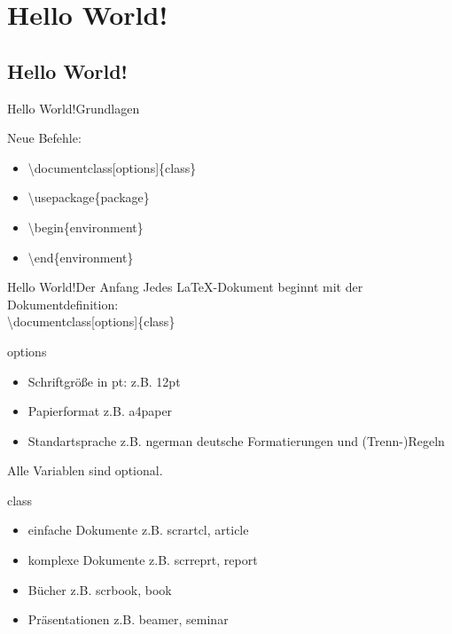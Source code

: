 \section{Hello World!}\subsection{Hello World!}
\begin{frame}[fragile]{Hello World!}{Grundlagen}
\begin{exampleblock}{Neue Befehle:}
\begin{itemize} %
    \item \color{cred} \textbackslash documentclass\color{black}[\color{corange}options\color{black}]\{\color{cpurple}class\color{black}\}
    \item \color{cred}\textbackslash usepackage\color{black}\{\color{cblue}package\color{black}\}
    \item \color{cturkis}\textbackslash begin\color{black}\{\color{cpurple}environment\color{black}\}
    \item \color{cturkis}\textbackslash end\color{black}\{\color{cpurple}environment\color{black}\}
\end{itemize}
\end{exampleblock}
\end{frame}
\begin{frame}{Hello World!}{Der Anfang}
Jedes \LaTeX-Dokument beginnt mit der Dokumentdefinition:\\ \vspace{1.5mm}
\color{cred} \textbackslash documentclass\color{black}[\color{corange}options\color{black}]\{\color{cpurple}class\color{black}\}\\\vspace{2.5mm}
\begin{multicols}{2}
\color{corange}options\color{black}\\
\begin{itemize}
    \item Schriftgr\"o{\ss}e in pt: z.B. \color{corange}12pt\color{black}
    \item Papierformat z.B. \color{corange}a4paper\color{black}
    \item Standartsprache z.B. \color{corange}ngerman \color{black} deutsche Formatierungen und (Trenn-)Regeln
\end{itemize}
Alle Variablen sind optional.\columnbreak\pause

\color{cpurple}class\color{black}
\begin{itemize}
    \item einfache Dokumente z.B. \color{cpurple}scrartcl, article\color{black}
    \item komplexe Dokumente z.B. \color{cpurple}scrreprt, report\color{black}
    \item B\"ucher z.B. \color{cpurple}scrbook, book\color{black}
    \item Pr\"asentationen z.B. \color{cpurple}beamer, seminar\color{black}
\end{itemize}
\end{multicols}
\normalsize
\end{frame}
